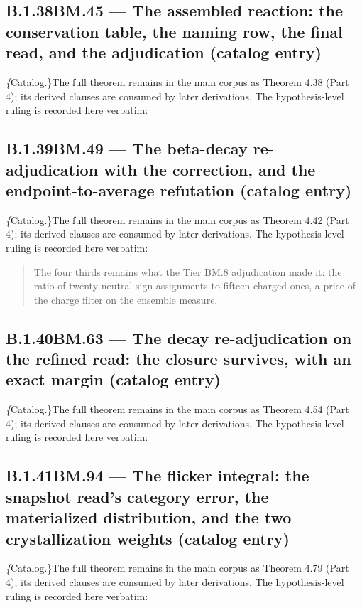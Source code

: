 \documentclass[11pt,openany]{report}
\theoremstyle{canonplain}
\theoremstyle{canondef}
\begin{document}
\subsection*{\texorpdfstring{B.1.38\quad BM.45 — The assembled reaction: the conservation table, the naming row, the final read, and the adjudication (catalog entry)}{BM.45 B.1.38}}
\label{tag:BM-45-cat}
{\small \textit\{Catalog.\}\quad The full theorem remains in the main corpus as Theorem 4.38 (Part 4); its derived clauses are consumed by later derivations. The hypothesis-level ruling is recorded here verbatim:}
\begin{quote}\small \end{quote}
\medskip
\subsection*{\texorpdfstring{B.1.39\quad BM.49 — The beta-decay re-adjudication with the correction, and the endpoint-to-average refutation (catalog entry)}{BM.49 B.1.39}}
\label{tag:BM-49-cat}
{\small \textit\{Catalog.\}\quad The full theorem remains in the main corpus as Theorem 4.42 (Part 4); its derived clauses are consumed by later derivations. The hypothesis-level ruling is recorded here verbatim:}
\begin{quote}\small The four thirds remains what the Tier BM.8 adjudication made it: the ratio of twenty neutral sign-assignments to fifteen charged ones, a price of the charge filter on the ensemble measure.\end{quote}
\medskip
\subsection*{\texorpdfstring{B.1.40\quad BM.63 — The decay re-adjudication on the refined read: the closure survives, with an exact margin (catalog entry)}{BM.63 B.1.40}}
\label{tag:BM-63-cat}
{\small \textit\{Catalog.\}\quad The full theorem remains in the main corpus as Theorem 4.54 (Part 4); its derived clauses are consumed by later derivations. The hypothesis-level ruling is recorded here verbatim:}
\begin{quote}\small \end{quote}
\medskip
\subsection*{\texorpdfstring{B.1.41\quad BM.94 — The flicker integral: the snapshot read's category error, the materialized distribution, and the two crystallization weights (catalog entry)}{BM.94 B.1.41}}
\label{tag:BM-94-cat}
{\small \textit\{Catalog.\}\quad The full theorem remains in the main corpus as Theorem 4.79 (Part 4); its derived clauses are consumed by later derivations. The hypothesis-level ruling is recorded here verbatim:}
\begin{quote}\small \end{quote}
\medskip
\end{document}
